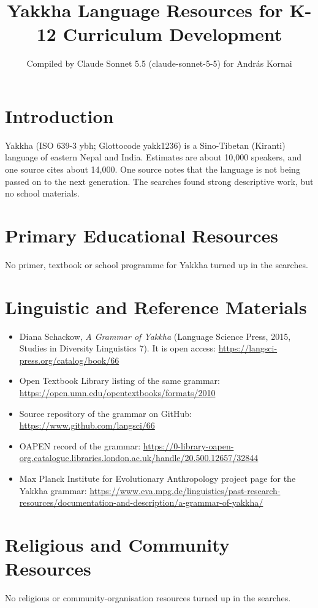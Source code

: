 \documentclass[12pt]{article}
\title{Yakkha Language Resources for K-12 Curriculum Development}
\author{Compiled by Claude Sonnet 5.5 (claude-sonnet-5-5) for Andr\'as Kornai}
\date{}
\begin{document}
\maketitle

\section{Introduction}
Yakkha (ISO 639-3 ybh; Glottocode yakk1236) is a Sino-Tibetan (Kiranti) language of eastern Nepal and India. Estimates are about 10,000 speakers, and one source cites about 14,000. One source notes that the language is not being passed on to the next generation. The searches found strong descriptive work, but no school materials.

\section{Primary Educational Resources}
No primer, textbook or school programme for Yakkha turned up in the searches.

\section{Linguistic and Reference Materials}
\begin{itemize}
\item Diana Schackow, \emph{A Grammar of Yakkha} (Language Science Press, 2015, Studies in Diversity Linguistics 7). It is open access:
\url{https://langsci-press.org/catalog/book/66}
\item Open Textbook Library listing of the same grammar: \url{https://open.umn.edu/opentextbooks/formats/2010}
\item Source repository of the grammar on GitHub: \url{https://www.github.com/langsci/66}
\item OAPEN record of the grammar: \url{https://0-library-oapen-org.catalogue.libraries.london.ac.uk/handle/20.500.12657/32844}
\item Max Planck Institute for Evolutionary Anthropology project page for the Yakkha grammar: \url{https://www.eva.mpg.de/linguistics/past-research-resources/documentation-and-description/a-grammar-of-yakkha/}
\end{itemize}

\section{Religious and Community Resources}
No religious or community-organisation resources turned up in the searches.
\end{document}

